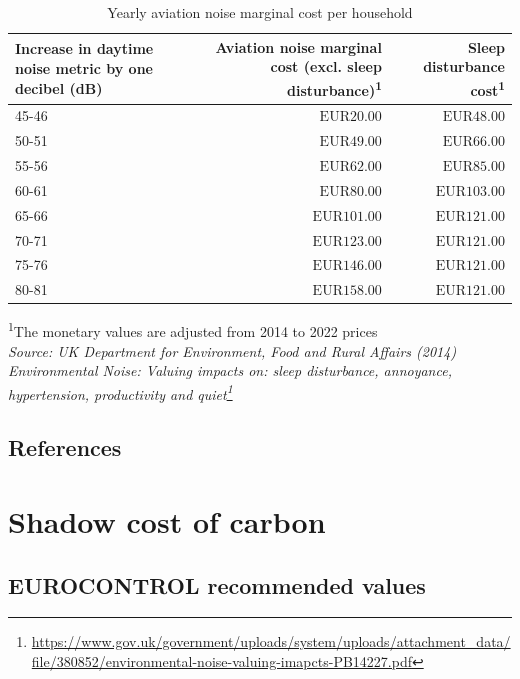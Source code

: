 \documentclass[
  11pt,
  a4paper,
]{book}
\DeclareRobustCommand{\href}[2]{#2\footnote{\url{#1}}}
\begin{document}
\hypertarget{tbl-noise-household}{}
\setlength{\LTpost}{0mm}
\begin{longtable}{lrr}
\caption{\label{tbl-noise-household}Yearly aviation noise marginal cost per household }\tabularnewline

\toprule
Increase in daytime noise metric by one decibel (dB) & Aviation noise marginal cost (excl. sleep disturbance)\textsuperscript{1} & Sleep disturbance cost\textsuperscript{1} \\ 
\midrule
45-46 & $\text{EUR}20.00$ & $\text{EUR}48.00$ \\ 
50-51 & $\text{EUR}49.00$ & $\text{EUR}66.00$ \\ 
55-56 & $\text{EUR}62.00$ & $\text{EUR}85.00$ \\ 
60-61 & $\text{EUR}80.00$ & $\text{EUR}103.00$ \\ 
65-66 & $\text{EUR}101.00$ & $\text{EUR}121.00$ \\ 
70-71 & $\text{EUR}123.00$ & $\text{EUR}121.00$ \\ 
75-76 & $\text{EUR}146.00$ & $\text{EUR}121.00$ \\ 
80-81 & $\text{EUR}158.00$ & $\text{EUR}121.00$ \\ 
\bottomrule
\end{longtable}
\begin{minipage}{\linewidth}
\textsuperscript{1}The monetary values are adjusted from 2014 to 2022 prices\\
\emph{Source: \href{https://www.gov.uk/government/uploads/system/uploads/attachment_data/file/380852/environmental-noise-valuing-imapcts-PB14227.pdf}{UK Department for Environment, Food and Rural Affairs (2014) Environmental Noise: Valuing impacts on: sleep disturbance, annoyance, hypertension, productivity and quiet}}\\
\end{minipage}

\hypertarget{references-9}{%
\section{References}\label{references-9}}

\hypertarget{sec-shadow-cost-of-carbon}{%
\chapter{Shadow cost of carbon}\label{sec-shadow-cost-of-carbon}}

\hypertarget{eurocontrol-recommended-values-7}{%
\section{EUROCONTROL recommended
values}\label{eurocontrol-recommended-values-7}}
\end{document}
